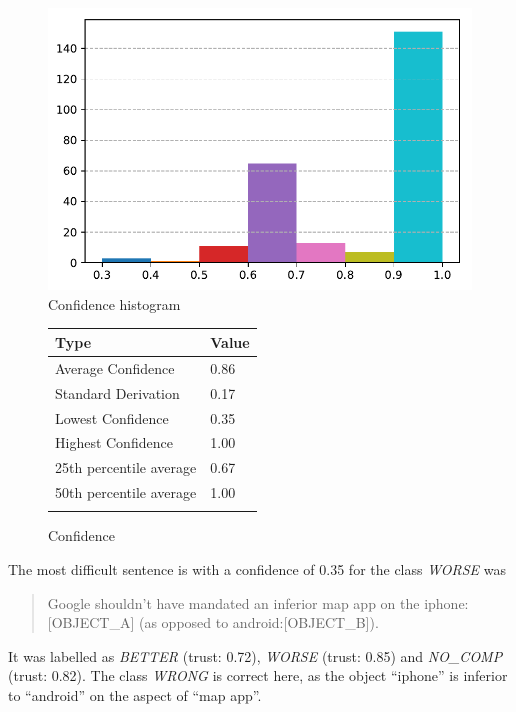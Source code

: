 \begin{figure}
\centering
\caption{Confidence histogram}
\label{pre:conf}
\includegraphics[scale=0.6]{images/prestudy/confidence.pdf}
\end{figure}


\begin{figure}[h]
\centering
\caption{Confidence}
\begin{tabular}{@{}ll@{}}
\toprule
Type & Value  \\ \midrule
Average Confidence & 0.86 \\
Standard Derivation & 0.17 \\
Lowest Confidence & 0.35\\
Highest Confidence & 1.00\\
25th percentile average & 0.67\\
50th percentile average & 1.00\\
\bottomrule
\label{pre:conf-table}
\end{tabular}
\end{figure}





The most difficult sentence is with a confidence of 0.35 for the class \emph{WORSE} was
\begin{quote}
Google shouldn't have mandated an inferior map app on the iphone:[OBJECT\_A] (as opposed to android:[OBJECT\_B]).
\end{quote}

It was labelled as \emph{BETTER} (trust: 0.72), \emph{WORSE} (trust: 0.85) and \emph{NO\_COMP} (trust: 0.82). The class \emph{WRONG} is correct here, as the object \enquote{iphone} is inferior to \enquote{android} on the aspect of \enquote{map app}.

